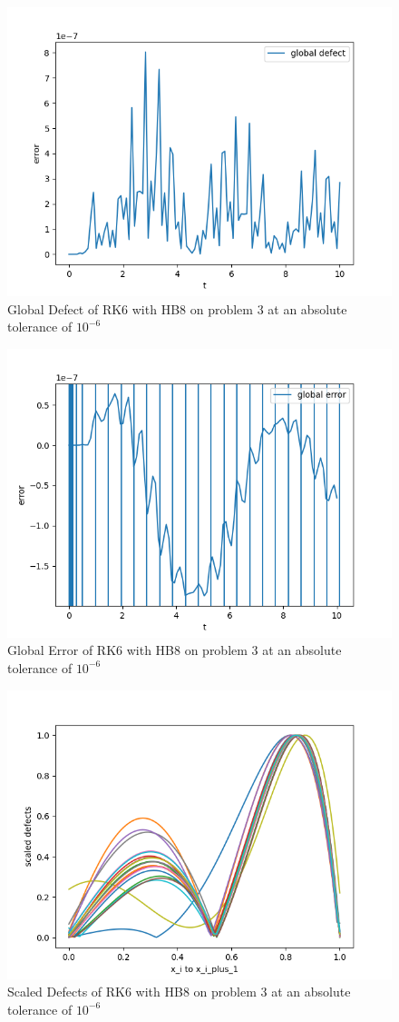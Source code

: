 \documentclass{article}
\begin{document}
\begin{figure}[H]
\centering
\includegraphics[width=0.7\linewidth]{./figures/rk6_with_hb8_p3_global_defect}
\caption{Global Defect of RK6 with HB8 on problem 3 at an absolute tolerance of $10^{-6}$}
\label{fig:rk6_with_hb8_p3_global_defect}
\end{figure}

\begin{figure}[H]
\centering
\includegraphics[width=0.7\linewidth]{./figures/rk6_with_hb8_p3_global_error}
\caption{Global Error of RK6 with HB8 on problem 3 at an absolute tolerance of $10^{-6}$}
\label{fig:rk6_with_hb8_p3_global_error}
\end{figure}

\begin{figure}[H]
\centering
\includegraphics[width=0.7\linewidth]{./figures/rk6_with_hb8_p3_scaled_defects}
\caption{Scaled Defects of RK6 with HB8 on problem 3 at an absolute tolerance of $10^{-6}$}
\label{fig:rk6_with_hb8_p3_scaled_defects}
\end{figure}
\end{document}
